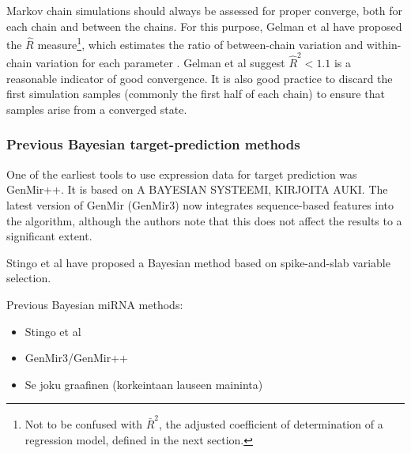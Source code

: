 Markov chain simulations should always be assessed for proper converge, both
for each chain and between the chains. For this purpose, Gelman et al have
proposed the $\hat{R}$ measure\footnote{Not to be confused with $\bar{R}^2$,
the adjusted coefficient of determination of a regression model, defined in
the next section.}, which estimates the ratio of between-chain variation and
within-chain variation for each parameter \citep{Gelman2013}. Gelman et al
suggest $\hat{R}^2 < 1.1$ is a reasonable indicator of good convergence. It is
also good practice to discard the first simulation samples (commonly the first
half of each chain) to ensure that samples arise from a converged state.


\subsubsection{Previous Bayesian target-prediction methods}


One of the earliest tools to use expression data for target prediction was
GenMir++. It is based on A BAYESIAN SYSTEEMI, KIRJOITA AUKI.
The latest version of GenMir (GenMir3) now integrates sequence-based features
into the algorithm, although the authors note that this does not affect the
results to a significant extent.

Stingo et al have proposed a Bayesian method based on spike-and-slab variable
selection.

Previous Bayesian miRNA methods:
\begin{itemize}
  \item Stingo et al
  \item GenMir3/GenMir++
  \item Se joku graafinen (korkeintaan lauseen maininta)
\end{itemize}



